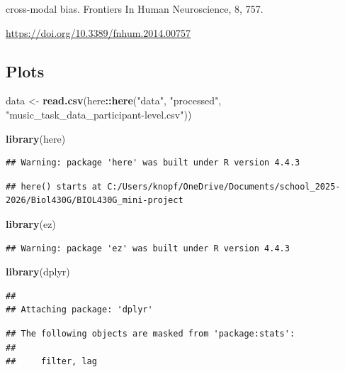 \documentclass[
]{article}
\newenvironment{Shaded}{\begin{snugshade}}{\end{snugshade}}
\newcommand{\FunctionTok}[1]{\textcolor[rgb]{0.13,0.29,0.53}{\textbf{#1}}}
\newcommand{\NormalTok}[1]{#1}
\newcommand{\OtherTok}[1]{\textcolor[rgb]{0.56,0.35,0.01}{#1}}
\newcommand{\SpecialCharTok}[1]{\textcolor[rgb]{0.81,0.36,0.00}{\textbf{#1}}}
\newcommand{\StringTok}[1]{\textcolor[rgb]{0.31,0.60,0.02}{#1}}
\begin{document}
cross-modal bias. Frontiers In Human Neuroscience, 8, 757.~

\url{https://doi.org/10.3389/fnhum.2014.00757}

\subsection{Plots}\label{plots}

\begin{Shaded}
\begin{Highlighting}[]
\NormalTok{data }\OtherTok{\textless{}{-}} \FunctionTok{read.csv}\NormalTok{(here}\SpecialCharTok{::}\FunctionTok{here}\NormalTok{(}\StringTok{"data"}\NormalTok{, }\StringTok{"processed"}\NormalTok{, }\StringTok{"music\_task\_data\_participant{-}level.csv"}\NormalTok{))}

\FunctionTok{library}\NormalTok{(here)}
\end{Highlighting}
\end{Shaded}

\begin{verbatim}
## Warning: package 'here' was built under R version 4.4.3
\end{verbatim}

\begin{verbatim}
## here() starts at C:/Users/knopf/OneDrive/Documents/school_2025-2026/Biol430G/BIOL430G_mini-project
\end{verbatim}

\begin{Shaded}
\begin{Highlighting}[]
\FunctionTok{library}\NormalTok{(ez)}
\end{Highlighting}
\end{Shaded}

\begin{verbatim}
## Warning: package 'ez' was built under R version 4.4.3
\end{verbatim}

\begin{Shaded}
\begin{Highlighting}[]
\FunctionTok{library}\NormalTok{(dplyr)}
\end{Highlighting}
\end{Shaded}

\begin{verbatim}
## 
## Attaching package: 'dplyr'
\end{verbatim}

\begin{verbatim}
## The following objects are masked from 'package:stats':
## 
##     filter, lag
\end{verbatim}
\end{document}
